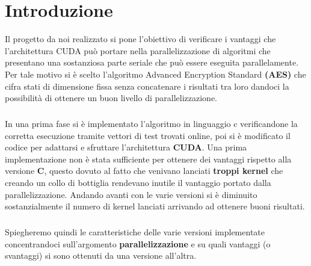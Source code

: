 \chapter{Introduzione}
Il progetto da noi realizzato si pone l'obiettivo di verificare i vantaggi che l'architettura CUDA può portare nella parallelizzazione di algoritmi che presentano una sostanziosa parte seriale che può essere eseguita parallelamente. Per tale motivo si è scelto l'algoritmo Advanced Encryption Standard \textbf{(AES)} che cifra stati di dimensione fissa senza concatenare i risultati tra loro dandoci la possibilità di ottenere un buon livello di parallelizzazione.

\paragraph{}In una prima fase si è implementato l'algoritmo in linguaggio c verificandone la corretta esecuzione tramite vettori di test trovati online, poi si è modificato il codice per adattarsi e sfruttare l'architettura \textbf{CUDA}. Una prima implementazione non è stata sufficiente per ottenere dei vantaggi rispetto alla versione \textbf{C}, questo dovuto al fatto che venivano lanciati \textbf{troppi kernel} che creando un collo di bottiglia rendevano inutile il vantaggio portato dalla parallelizzazione. Andando avanti con le varie versioni si è diminuito sostanzialmente il numero di kernel lanciati arrivando ad ottenere buoni risultati.

\paragraph{} Spiegheremo quindi le caratteristiche delle varie versioni implementate concentrandoci sull'argomento \textbf{parallelizzazione} e su quali vantaggi (o svantaggi) si sono ottenuti da una versione all'altra.